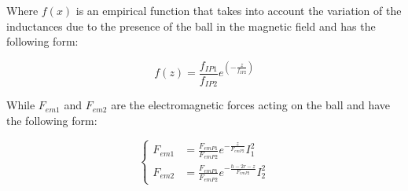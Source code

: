 Where $f(x)$ is an empirical function that takes into account the variation of the inductances due to the presence of the ball in the magnetic field and has the following form:

\begin{equation}
    f(z) = \frac{f_{IP1}}{f_{IP2}} e^{\left(-\frac{z}{f_{IP2}}\right)}
\end{equation}

While $F_{em1}$ and $F_{em2}$ are the electromagnetic forces acting on the ball and have the following form:

\begin{equation}
    \begin{cases}
        F_{em1} & = \frac{F_{emP1}}{F_{emP2}} e^{-\frac{z}{F_{emP2}}}  I_1^2          \\
        F_{em2} & = \frac{F_{emP1}}{F_{emP2}} e^{-\frac{h - 2r - z}{F_{emP2}}}  I_2^2
    \end{cases}
\end{equation}
